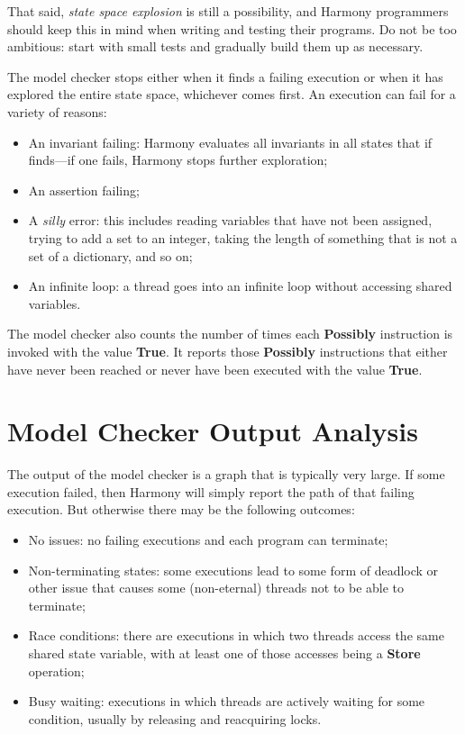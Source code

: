\documentclass{report}
\begin{document}
That said, \emph{state space explosion} is still a possibility, and
Harmony programmers should keep this in mind when writing and testing
their programs.  Do not be too ambitious: start with small tests and
gradually build them up as necessary.

The model checker stops either when it finds a failing execution or when
it has explored the entire state space, whichever comes first.  An execution
can fail for a variety of reasons:

\begin{itemize}
\item An invariant failing: Harmony evaluates all invariants in all states
that if finds---if one fails, Harmony stops further exploration;
\item An assertion failing;
\item A \emph{silly} error: this includes reading variables that have not
been assigned, trying to add a set to an integer, taking the length of
something that is not a set of a dictionary, and so on;
\item An infinite loop: a thread goes into an infinite loop without
accessing shared variables.
\end{itemize}

The model checker also counts the number of times each \textbf{Possibly}
instruction is invoked with the value \textbf{True}.  It reports those
\textbf{Possibly} instructions that either have never been reached or
never have been executed with the value \textbf{True}.

\section{Model Checker Output Analysis}

The output of the model checker is a graph that is typically very large.
If some execution failed, then Harmony will simply report the path of
that failing execution.  But otherwise there may be the following
outcomes:

\begin{itemize}
\item No issues: no failing executions and each program can terminate;
\item Non-terminating states: some executions lead to some form of deadlock
or other issue that causes some (non-eternal) threads not to be able to
terminate;
\item Race conditions: there are executions in which two threads access
the same shared state variable, with at least one of those accesses being a
\textbf{Store} operation;
\item Busy waiting: executions in which threads are actively waiting for
some condition, usually by releasing and reacquiring locks.
\end{itemize}
\end{document}

